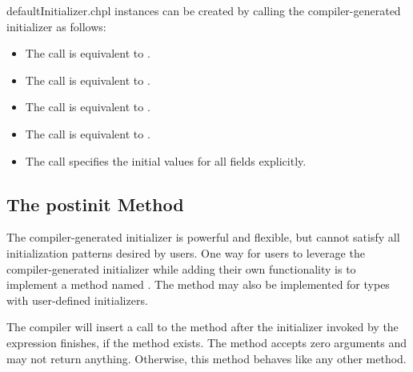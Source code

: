 \begin{chapelexample}{defaultInitializer.chpl}
 instances can be created by calling the compiler-generated initializer as follows:
\begin{itemize}
\item The call  is equivalent to .
\item The call  is equivalent to .
\item The call  is equivalent to .
\item The call  is equivalent to .
\item The call  specifies the initial values for all fields explicitly.
\end{itemize}
\end{chapelexample}

\subsection{The postinit Method}
\label{The_postinit_Method}

The compiler-generated initializer is powerful and flexible, but cannot satisfy
all initialization patterns desired by users. One way for users to leverage
the compiler-generated initializer while adding their own functionality is to
implement a method named . The  method may also
be implemented for types with user-defined initializers.

The compiler will insert a call to the  method after the
initializer invoked by the  expression finishes, if the method
exists. The  method accepts zero arguments and may not return
anything. Otherwise, this method behaves like any other method.

